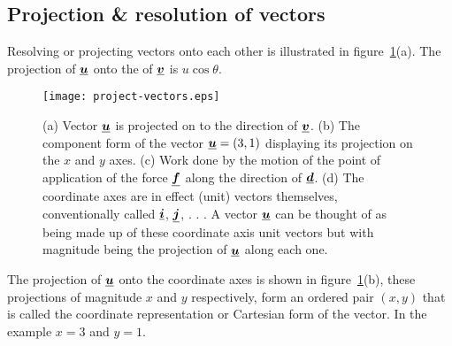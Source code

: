 



\addtolength{\topmargin}{-0.7 cm}
\setlength{\columnsep}{22pt}


\subsection*{Projection \& resolution of vectors}
Resolving or projecting vectors onto each other is illustrated in
figure~\ref{fig:project-vectors}(a).  The projection of $\mathit{\underline{\boldsymbol{u}}}$ onto the  of $\mathit{\underline{\boldsymbol{v}}}$ is $u \cos\theta$.
\begin{figure}[h!]
\centering
\texttt{[image: project-vectors.eps]}
\caption{(a) Vector $\mathit{\underline{\boldsymbol{u}}}$ is projected on to the direction of $\mathit{\underline{\boldsymbol{v}}}$.  (b) The component form of the vector $\mathit{\underline{\boldsymbol{u}}} = (3,1)$ displaying its projection on the $x$ and $y$ axes. (c) Work done by the motion of the point of application of the force $\mathit{\underline{\boldsymbol{f}}}$ along the direction of $\mathit{\underline{\boldsymbol{d}}}$. (d) The coordinate axes are in effect (unit) vectors themselves, conventionally called $\mathit{\underline{\boldsymbol{i}}}$, $\mathit{\underline{\boldsymbol{j}}}$, . . . A vector $\mathit{\underline{\boldsymbol{u}}}$ can be thought of as being made up of these coordinate axis unit vectors but with magnitude being the projection of $\mathit{\underline{\boldsymbol{u}}}$ along each one. }\label{fig:project-vectors}
\end{figure}
The projection of $\mathit{\underline{\boldsymbol{u}}}$ onto the coordinate axes is shown in figure~\ref{fig:project-vectors}(b), these projections of magnitude $x$ and $y$ respectively, form an ordered pair $(x,y)$ that is called the coordinate representation or Cartesian form of the vector.  In the example $x=3$ and $y=1$.
